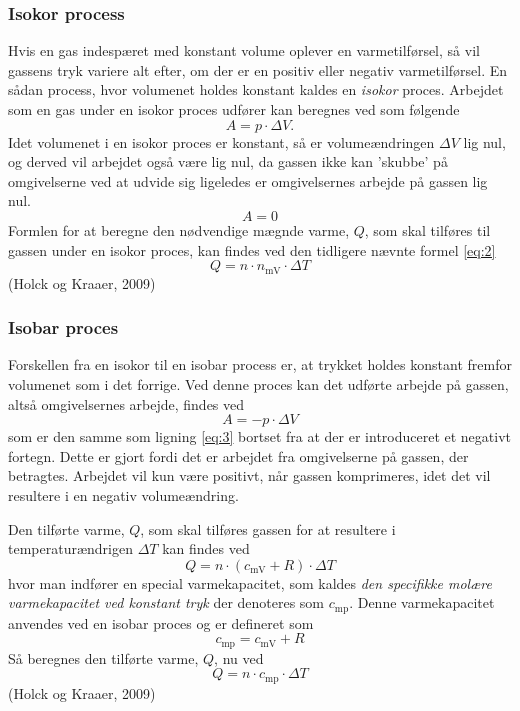 \documentclass[SRC.tex]{subfiles}
\begin{document}
	\subsubsection{Isokor process} 
	Hvis en gas indespæret med konstant volume oplever en varmetilførsel, så vil 
	gassens tryk variere alt efter, om der er en positiv eller negativ varmetilførsel. En sådan
	process, hvor volumenet holdes konstant kaldes en \textit{isokor} proces. Arbejdet som en 
	gas under en isokor proces udfører kan beregnes ved som følgende  
	\begin{equation}
	A = p \cdot \Delta V.
	\label{eq:3}
	\end{equation}
	Idet volumenet i en isokor proces er konstant, så er volumeændringen \(\Delta V\) lig nul, og derved vil arbejdet
	også være lig nul, da gassen ikke kan 'skubbe' på omgivelserne ved at udvide sig ligeledes er 
	omgivelsernes arbejde på gassen lig nul.
	\begin{equation}
	A = 0
	\end{equation}
	Formlen for at beregne den nødvendige mægnde varme, \(Q\), som skal tilføres til gassen under 
	en isokor proces, kan findes ved den tidligere nævnte formel \eqref{eq:2}
	\begin{equation}
	Q = n \cdot n_{\text{mV}} \cdot \Delta T
	\end{equation}
	(Holck og Kraaer, 2009)
	
	\subsubsection{Isobar proces}
	Forskellen fra en isokor til en isobar process er, at trykket 
	holdes konstant fremfor volumenet som i det forrige. Ved
	denne proces kan det udførte arbejde på gassen, altså 
	omgivelsernes arbejde, findes ved
	\begin{equation}
	A = -p \cdot \Delta V
	\end{equation}
	som er den samme som ligning \eqref{eq:3} bortset fra at
	der er introduceret et negativt fortegn. Dette er gjort fordi det er arbejdet fra omgivelserne 
	på gassen, der betragtes. Arbejdet vil kun være positivt, når gassen komprimeres, idet det 
	vil resultere i en negativ volumeændring. 
	
	Den tilførte varme, \(Q\), som skal tilføres gassen for at 
	resultere i temperaturændrigen \(\Delta T\) kan findes ved
	\begin{equation}
	Q = n \cdot (c_{\text{mV}} + R) \cdot \Delta T
	\end{equation} 
	hvor man indfører en special varmekapacitet, som kaldes \textit{den specifikke molære varmekapacitet ved konstant tryk} der denoteres som \(c_{\text{mp}}\). Denne varmekapacitet anvendes ved en isobar proces og er defineret som
	\begin{equation}
	c_{\text{mp}} = c_{\text{mV}} + R
	\end{equation}
	Så beregnes den tilførte varme, \(Q\), nu ved
	\begin{equation}
	Q = n \cdot c_{\text{mp}} \cdot \Delta T
	\end{equation}
	(Holck og Kraaer, 2009)
\end{document}
